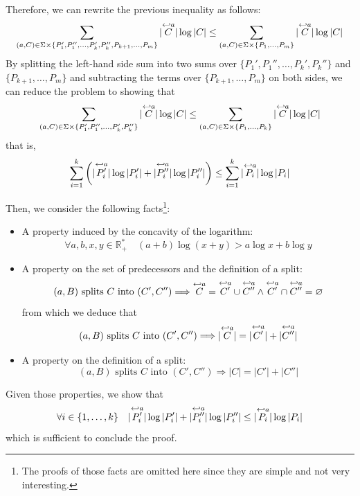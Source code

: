 \documentclass[12pt, a4 paper]{article}
\theoremstyle{definition}
\begin{document}
Therefore, we can rewrite the previous inequality as follows:
\begin{equation*}
    \sum_{(a, C) \in \Sigma\times \{P_1', P_1'', \dots, P_k', P_k'', P_{k+1}, \dots, P_m\}} | \overset{\hookleftarrow {a}}{C} | \log | C | \leq \sum_{(a, C) \in \Sigma\times \{P_1, \dots, P_m\}} | \overset{\hookleftarrow {a}}{C} | \log | C |
\end{equation*}
By splitting the left-hand side sum into two sums over $\{P_1', P_1'', \dots, P_k', P_k''\}$ and $\{P_{k+1}, \dots, P_m\}$ and subtracting the terms over $\{P_{k+1}, \dots, P_m\}$ on both sides, we can reduce the problem to showing that
\begin{equation*}
    \sum_{(a, C) \in \Sigma\times \{P_1', P_1'', \dots, P_k', P_k''\}} | \overset{\hookleftarrow {a}}{C} | \log | C | \leq \sum_{(a, C) \in \Sigma\times \{P_1, \dots, P_k\}} | \overset{\hookleftarrow {a}}{C} | \log | C |
\end{equation*}
that is,
\begin{equation*}
    \sum_{i=1}^k \left(| \overset{\hookleftarrow {a}}{P_i'} | \log | P_i' | + | \overset{\hookleftarrow {a}}{P_i''} | \log | P_i'' |\right) \leq \sum_{i=1}^k | \overset{\hookleftarrow {a}}{P_i} | \log | P_i |
\end{equation*}

\bigskip

Then, we consider the following facts\footnote{The proofs of those facts are omitted here since they are simple and not very interesting.}:
\begin{itemize}
    \item A property induced by the concavity of the logarithm:
    \begin{equation*}
        \forall a, b, x, y \in \mathbb{R}_+^* \quad (a+b)\log (x+y) > a\log x + b\log y
    \end{equation*}
    \item A property on the set of predecessors and the definition of a split:
    \begin{equation*}
        (a, B) \text{ splits } C \text{ into } (C', C'') \Longrightarrow \overset{\hookleftarrow {a}}{C} = \overset{\hookleftarrow {a}}{C'} \cup \overset{\hookleftarrow {a}}{C''} \land \overset{\hookleftarrow {a}}{C'} \cap \overset{\hookleftarrow {a}}{C''} = \varnothing
    \end{equation*}
    from which we deduce that
    \begin{equation*}
        (a, B) \text{ splits } C \text{ into } (C', C'') \Longrightarrow |\overset{\hookleftarrow {a}}{C}| = |\overset{\hookleftarrow {a}}{C'}| + |\overset{\hookleftarrow {a}}{C''}|
    \end{equation*}
    \item A property on the definition of a split:
    \begin{equation*}
        (a, B) \text{ splits } C \text{ into } (C', C'') \Longrightarrow |C| = |C'| + |C''|
    \end{equation*}
\end{itemize}
Given those properties, we show that
\begin{equation*}
    \forall i \in \{1, \dots, k\} \quad | \overset{\hookleftarrow {a}}{P_i'} | \log | P_i' | + | \overset{\hookleftarrow {a}}{P_i''} | \log | P_i'' | \leq | \overset{\hookleftarrow {a}}{P_i} | \log | P_i |
\end{equation*}
which is sufficient to conclude the proof.
\end{document}
